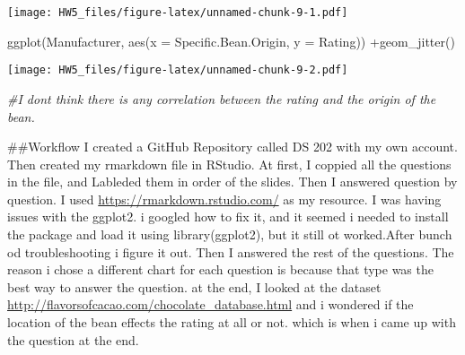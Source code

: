 \documentclass[
]{article}
\newenvironment{Shaded}{\begin{snugshade}}{\end{snugshade}}
\newcommand{\AttributeTok}[1]{\textcolor[rgb]{0.77,0.63,0.00}{#1}}
\newcommand{\CommentTok}[1]{\textcolor[rgb]{0.56,0.35,0.01}{\textit{#1}}}
\newcommand{\FunctionTok}[1]{\textcolor[rgb]{0.00,0.00,0.00}{#1}}
\newcommand{\NormalTok}[1]{#1}
\newcommand{\SpecialCharTok}[1]{\textcolor[rgb]{0.00,0.00,0.00}{#1}}
\begin{document}
\texttt{[image: HW5\_files/figure-latex/unnamed-chunk-9-1.pdf]}

\begin{Shaded}
\begin{Highlighting}[]
\FunctionTok{ggplot}\NormalTok{(Manufacturer, }\FunctionTok{aes}\NormalTok{(}\AttributeTok{x =}\NormalTok{ Specific.Bean.Origin, }\AttributeTok{y =}\NormalTok{ Rating)) }\SpecialCharTok{+}\FunctionTok{geom\_jitter}\NormalTok{()}
\end{Highlighting}
\end{Shaded}

\texttt{[image: HW5\_files/figure-latex/unnamed-chunk-9-2.pdf]}

\begin{Shaded}
\begin{Highlighting}[]
\CommentTok{\#I dont think there is any correlation between the rating and the origin of the bean.  }
\end{Highlighting}
\end{Shaded}

\#\#Workflow I created a GitHub Repository called DS 202 with my own
account. Then created my rmarkdown file in RStudio. At first, I coppied
all the questions in the file, and Lableded them in order of the slides.
Then I answered question by question. I used
\url{https://rmarkdown.rstudio.com/} as my resource. I was having issues
with the ggplot2. i googled how to fix it, and it seemed i needed to
install the package and load it using library(ggplot2), but it still ot
worked.After bunch od troubleshooting i figure it out. Then I answered
the rest of the questions. The reason i chose a different chart for each
question is because that type was the best way to answer the question.
at the end, I looked at the dataset
\url{http://flavorsofcacao.com/chocolate_database.html} and i wondered
if the location of the bean effects the rating at all or not. which is
when i came up with the question at the end.
\end{document}
